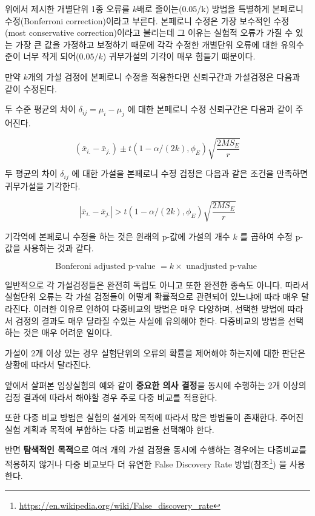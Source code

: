 \documentclass[
]{book}
\makeatletter
\renewcommand{\href}[2]{#2\footnote{\url{#1}}}
\newenvironment{kframe}{%
\medskip{}
\setlength{\fboxsep}{.8em}
 \def\at@end@of@kframe{}%
 \ifinner\ifhmode%
  \def\at@end@of@kframe{\end{minipage}}%
  \begin{minipage}{\columnwidth}%
 \fi\fi%
 \def\FrameCommand##1{\hskip\@totalleftmargin \hskip-\fboxsep
 \colorbox{shadecolor}{##1}\hskip-\fboxsep
     \hskip-\linewidth \hskip-\@totalleftmargin \hskip\columnwidth}%
 \MakeFramed {\advance\hsize-\width
   \@totalleftmargin\z@ \linewidth\hsize
   \@setminipage}}%
 {\par\unskip\endMakeFramed%
 \at@end@of@kframe}
\newenvironment{rmdblock}[1]
  {
  \begin{itemize}
  \renewcommand{\labelitemi}{
    \raisebox{-.7\height}[0pt][0pt]{
      {\setkeys{Gin}{width=3em,keepaspectratio}\texttt{[image: images/\#1]}}
    }
  }
  \setlength{\fboxsep}{1em}
  \begin{kframe}
  \item
  }
  {
  \end{kframe}
  \end{itemize}
  }
\newenvironment{rmdnote}
  {\begin{rmdblock}{note}}
  {\end{rmdblock}}
\makeatother
\begin{document}
위에서 제시한 개별단위 1종 오류를 \(k\)배로 줄이는(0.05/k) 방법을 특별하게
본페로니 수정(Bonferroni correction)이라고 부른다. 본페로니 수정은 가장
보수적인 수정(most conservative correction)이라고 불리는데 그 이유는
실험적 오류가 가질 수 있는 가장 큰 값을 가정하고 보정하기 때문에 각각
수정한 개별단위 오류에 대한 유의수준이 너무 작게 되어(\(0.05/k\))
귀무가설의 기각이 매우 힘들기 떄문이다.

만약 \(k\)개의 가설 검정에 본페로니 수정을 적용한다면 신뢰구간과
가설검정은 다음과 같이 수정된다.

두 수준 평균의 차이 \(\delta_{ij} = \mu_i - \mu_j\) 에 대한 본페로니 수정
신뢰구간은 다음과 같이 주어진다.

\begin{equation}
( \bar {x}_{i.} - \bar {x}_{j.})   \pm t(1-\alpha/(2k), \phi_E) \sqrt{ \frac{2MS_E}{r}} 
\label{eq:twomeancibon}
\end{equation}

두 평균의 차이 \(\delta_{ij}\) 에 대한 가설을 본페로니 수정 검정은 다음과
같은 조건을 만족하면 귀무가설을 기각한다.

\begin{equation}
 \left | \bar {x}_{i.} - \bar {x}_{j.} \right | > t(1-\alpha/(2k), \phi_E) \sqrt{ \frac{2MS_E}{r}} 
\label{eq:lsdbon}
\end{equation}

기각역에 본페로니 수정을 하는 것은 윈래의 p-값에 가설의 개수 \(k\) 를
곱하여 수정 p-값을 사용하는 것과 같다.

\begin{equation}
   \text{Bonferoni adjusted p-value } = k 
   \times \text{ unadjusted p-value } 
\label{eq:pbon}
\end{equation}

일반적으로 각 가설검정들은 완전히 독립도 아니고 또한
완전한 종속도 아니다. 따라서 실험단위 오류는 각 가설 검정들이 어떻게
확률적으로 관련되어 있느냐에 따라 매우 달라진다. 이러한 이유로 인하여
다중비교의 방법은 매우 다양하며, 선택한 방법에 따라서 검정의 결과도 매우
달라질 수있는 사실에 유의해야 한다. 다중비교의 방법을 선택하는 것은 매우
어려운 일이다.

\begin{rmdnote}
가설이 2개 이상 있는 경우 실험단위의 오류의 확률을 제어해야 하는지에 대한 판단은
상황에 따라서 달라진다.

앞에서 살펴본 임상실험의 예와 같이 \textbf{중요한 의사 결정}을 동시에 수행하는 2개 이상의
검정 결과에 따라서 해야할 경우 주로 다중 비교를 적용한다.

또한 다중 비교 방법은 실험의 설계와 목적에 따라서 많은 방법들이 존재한다. 주어진 실험 계획과 목적에 부합하는 다중 비교법을 선택해야 한다.

반면 \textbf{탐색적인 목적}으로 여러 개의 가설 검정을 동시에 수행하는 경우에는 다중비교를 적용하지 않거나
다중 비교보다 더 유연한 False Discovery Rate 방법(\href{https://en.wikipedia.org/wiki/False_discovery_rate}{참조})
을 사용한다.
\end{rmdnote}
\end{document}
